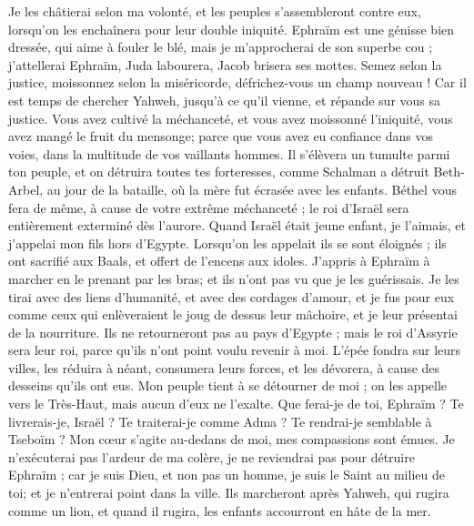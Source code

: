 \begin{multicols}{2}
Je les châtierai selon ma volonté, et les peuples s'assembleront contre eux, lorsqu'on les enchaînera pour leur double iniquité.
Ephraïm est une génisse bien dressée, qui aime à fouler le blé, mais je m'approcherai de son superbe cou ; j'attellerai Ephraïm, Juda labourera, Jacob brisera ses mottes.
Semez selon la justice, moissonnez selon la miséricorde, défrichez-vous un champ nouveau ! Car il est temps de chercher Yahweh, jusqu'à ce qu'il vienne, et répande sur vous sa justice.
Vous avez cultivé la méchanceté, et vous avez moissonné l'iniquité, vous avez mangé le fruit du mensonge; parce que vous avez eu confiance dans vos voies, dans la multitude de vos vaillants hommes.
Il s'élèvera un tumulte parmi ton peuple, et on détruira toutes tes forteresses, comme Schalman a détruit Beth-Arbel, au jour de la bataille, où la mère fut écrasée avec les enfants.
Béthel vous fera de même, à cause de votre extrême méchanceté ; le roi d'Israël sera entièrement exterminé dès l'aurore.
\VerseOne{}Quand Israël était jeune enfant, je l'aimais, et j'appelai mon fils hors d'Egypte.
Lorsqu'on les appelait ils se sont éloignés ; ils ont sacrifié aux Baals, et offert de l'encens aux idoles.
J'appris à Ephraïm à marcher en le prenant par les bras; et ils n'ont pas vu que je les guérissais.
Je les tirai avec des liens d'humanité, et avec des cordages d'amour, et je fus pour eux comme ceux qui enlèveraient le joug de dessus leur mâchoire, et je leur présentai de la nourriture.
Ils ne retourneront pas au pays d'Egypte ; mais le roi d'Assyrie sera leur roi, parce qu'ils n'ont point voulu revenir à moi.
L'épée fondra sur leurs villes, les réduira à néant, consumera leurs forces, et les dévorera, à cause des desseins qu'ils ont eus.
Mon peuple tient à se détourner de moi ; on les appelle vers le Très-Haut, mais aucun d'eux ne l'exalte.
Que ferai-je de toi, Ephraïm ? Te livrerais-je, Israël ? Te traiterai-je comme Adma ? Te rendrai-je semblable à Tseboïm ? Mon cœur s'agite au-dedans de moi, mes compassions sont émues.
Je n'exécuterai pas l'ardeur de ma colère, je ne reviendrai pas pour détruire Ephraïm ; car je suis Dieu, et non pas un homme, je suis le Saint au milieu de toi; et je n'entrerai point dans la ville.
Ils marcheront après Yahweh, qui rugira comme un lion, et quand il rugira, les enfants accourront en hâte de la mer.

\end{multicols}
